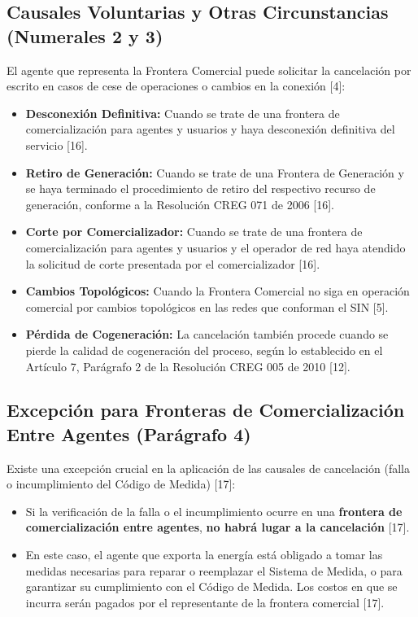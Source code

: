 \documentclass[a5paper]{book}%
\begin{document}
  \subsection{Causales Voluntarias y Otras Circunstancias (Numerales 2 y 3)}
  
  El agente que representa la Frontera Comercial puede solicitar la cancelación por escrito en casos de cese de operaciones o cambios en la conexión [4]:
  
  \begin{itemize}
  	\item \textbf{Desconexión Definitiva:} Cuando se trate de una frontera de comercialización para agentes y usuarios y haya desconexión definitiva del servicio [16].
  	\item \textbf{Retiro de Generación:} Cuando se trate de una Frontera de Generación y se haya terminado el procedimiento de retiro del respectivo recurso de generación, conforme a la Resolución CREG 071 de 2006 [16].
  	\item \textbf{Corte por Comercializador:} Cuando se trate de una frontera de comercialización para agentes y usuarios y el operador de red haya atendido la solicitud de corte presentada por el comercializador [16].
  	\item \textbf{Cambios Topológicos:} Cuando la Frontera Comercial no siga en operación comercial por cambios topológicos en las redes que conforman el SIN [5].
  	\item \textbf{Pérdida de Cogeneración:} La cancelación también procede cuando se pierde la calidad de cogeneración del proceso, según lo establecido en el Artículo 7, Parágrafo 2 de la Resolución CREG 005 de 2010 [12].
  \end{itemize}
  
  \subsection{Excepción para Fronteras de Comercialización Entre Agentes (Parágrafo 4)}
  
  Existe una excepción crucial en la aplicación de las causales de cancelación (falla o incumplimiento del Código de Medida) [17]:
  
  \begin{itemize}
  	\item Si la verificación de la falla o el incumplimiento ocurre en una \textbf{frontera de comercialización entre agentes}, \textbf{no habrá lugar a la cancelación} [17].
  	\item En este caso, el agente que exporta la energía está obligado a tomar las medidas necesarias para reparar o reemplazar el Sistema de Medida, o para garantizar su cumplimiento con el Código de Medida. Los costos en que se incurra serán pagados por el representante de la frontera comercial [17].
  \end{itemize}
  
\end{document}
